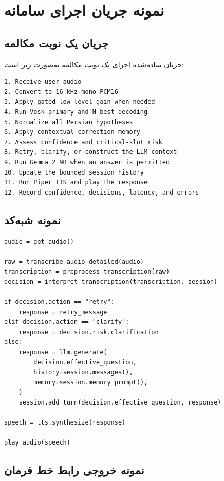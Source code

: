 
\chapter{نمونه جریان اجرای سامانه}

\section{جریان یک نوبت مکالمه}

جریان ساده‌شده اجرای یک نوبت مکالمه به‌صورت زیر است:

\begin{latin}\begin{verbatim}
1. Receive user audio
2. Convert to 16 kHz mono PCM16
3. Apply gated low-level gain when needed
4. Run Vosk primary and N-best decoding
5. Normalize all Persian hypotheses
6. Apply contextual correction memory
7. Assess confidence and critical-slot risk
8. Retry, clarify, or construct the LLM context
9. Run Gemma 2 9B when an answer is permitted
10. Update the bounded session history
11. Run Piper TTS and play the response
12. Record confidence, decisions, latency, and errors
\end{verbatim}\end{latin}


\section{نمونه شبه‌کد}

\begin{latin}\begin{verbatim}
audio = get_audio()

raw = transcribe_audio_detailed(audio)
transcription = preprocess_transcription(raw)
decision = interpret_transcription(transcription, session)

if decision.action == "retry":
    response = retry_message
elif decision.action == "clarify":
    response = decision.risk.clarification
else:
    response = llm.generate(
        decision.effective_question,
        history=session.messages(),
        memory=session.memory_prompt(),
    )
    session.add_turn(decision.effective_question, response)

speech = tts.synthesize(response)

play_audio(speech)
\end{verbatim}\end{latin}


\section{نمونه خروجی رابط خط فرمان}

